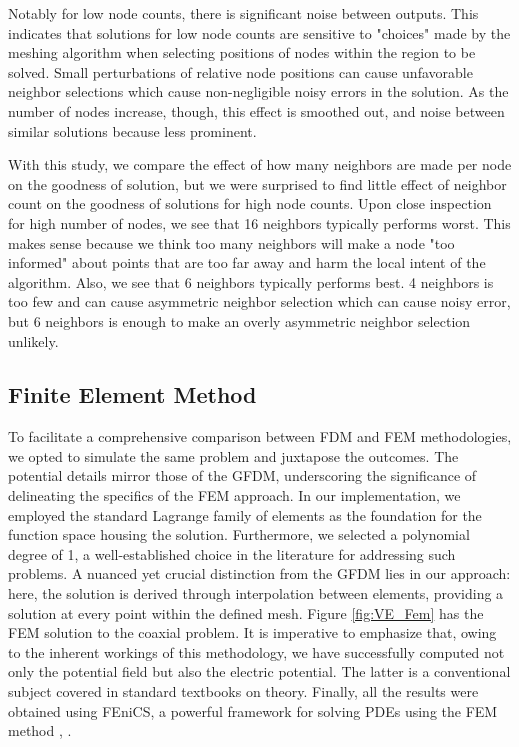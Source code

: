 \documentclass{PoS}
\begin{document}
Notably for low node counts, there is significant noise between outputs. This indicates that solutions for low node counts are sensitive to "choices" made by the meshing algorithm when selecting positions of nodes within the region to be solved. Small perturbations of relative node positions can cause unfavorable neighbor selections which cause non-negligible noisy errors in the solution. As the number of nodes increase, though, this effect is smoothed out, and noise between similar solutions because less prominent.

With this study, we compare the effect of how many neighbors are made per node on the goodness of solution, but we were surprised to find little effect of neighbor count on the goodness of solutions for high node counts. Upon close inspection for high number of nodes, we see that 16 neighbors typically performs worst. This makes sense because we think too many neighbors will make a node "too informed" about points that are too far away and harm the local intent of the algorithm. Also, we see that 6 neighbors typically performs best. 4 neighbors is too few and can cause asymmetric neighbor selection which can cause noisy error, but 6 neighbors is enough to make an overly asymmetric neighbor selection unlikely.

\subsection{Finite Element Method}

To facilitate a comprehensive comparison between FDM and FEM methodologies, we opted to simulate the same problem and juxtapose the outcomes. The potential details mirror those of the GFDM, underscoring the significance of delineating the specifics of the FEM approach. In our implementation, we employed the standard Lagrange family of elements as the foundation for the function space housing the solution. Furthermore, we selected a polynomial degree of 1, a well-established choice in the literature for addressing such problems. A nuanced yet crucial distinction from the GFDM lies in our approach: here, the solution is derived through interpolation between elements, providing a solution at every point within the defined mesh. Figure \ref{fig:VE_Fem} has the FEM solution to the coaxial problem. It is imperative to emphasize that, owing to the inherent workings of this methodology, we have successfully computed not only the potential field but also the electric potential. The latter is a conventional subject covered in standard textbooks on  theory. Finally, all the results were obtained using FEniCS, a powerful framework for solving PDEs using the FEM method \cite{alnaes2015fenics}, \cite{logg2012automated}.
\end{document}
